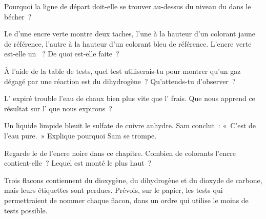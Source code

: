 \begin{exercise}[$\star\star$]\label{exo:g7:identifying-substances:5}
Pourquoi la ligne de départ doit-elle se trouver au-dessus du niveau du
 dans le bécher~?
\end{exercise}

\begin{exercise}[$\star\star$]\label{exo:g7:identifying-substances:6}
Le  d'une encre verte montre deux taches, l'une à la
hauteur d'un colorant jaune de référence, l'autre à la hauteur d'un
colorant bleu de référence. L'encre verte est-elle un ~? De
quoi est-elle faite~?
\end{exercise}

\begin{exercise}[$\star\star$]\label{exo:g7:identifying-substances:7}
À l'aide de la table de tests, quel test utiliserais-tu pour montrer
qu'un gaz dégagé par une réaction est du dihydrogène~? Qu'attends-tu
d'observer~?
\end{exercise}

\begin{exercise}[$\star\star$]\label{exo:g7:identifying-substances:8}
L' expiré trouble l'eau de chaux bien plus vite que l' frais. Que
nous apprend ce résultat sur l' que nous expirons~?
\end{exercise}

\begin{exercise}[$\star\star$]\label{exo:g7:identifying-substances:9}
Un liquide limpide bleuit le sulfate de cuivre anhydre. Sam conclut~:
«~C'est de l'eau pure.~» Explique pourquoi Sam se trompe.
\end{exercise}

\begin{exercise}[$\star\star$]\label{exo:g7:identifying-substances:10}
Regarde le  de l'encre noire dans ce chapitre. Combien de
colorants l'encre contient-elle~? Lequel est monté le plus haut~?
\end{exercise}

\begin{exercise}[$\star\star\star$]\label{exo:g7:identifying-substances:11}
Trois flacons contiennent du dioxygène, du dihydrogène et du dioxyde de
carbone, mais leurs étiquettes sont perdues. Prévois, sur le papier, les
tests qui permettraient de nommer chaque flacon, dans un ordre qui
utilise le moins de tests possible.
\end{exercise}

